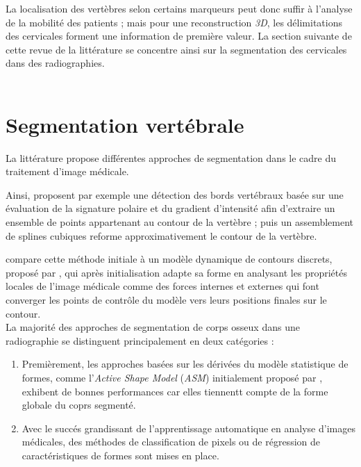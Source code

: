        La localisation des vertèbres selon certains marqueurs peut donc suffir à l'analyse de la mobilité des patients ; mais pour une reconstruction {\itshape 3D}, les délimitations des cervicales forment une information de première valeur. La section suivante de cette revue de la littérature se concentre ainsi sur la segmentation des cervicales dans des radiographies.
        \\\\


\section{Segmentation vertébrale}

    La littérature propose différentes approches de segmentation dans le cadre du traitement d'image médicale.

    Ainsi, \cite{Benjelloun2006b, Benjelloun2007} proposent par exemple une détection des bords vertébraux basée sur une évaluation de la signature polaire et du gradient d'intensité afin d'extraire un ensemble de points appartenant au contour de la vertèbre ; puis un assemblement de splines cubiques reforme approximativement le contour de la vertèbre.

    \cite{Benjelloun2008} compare cette méthode initiale à un modèle dynamique de contours discrets, proposé par \cite{Lobregt1995}, qui après initialisation adapte sa forme en analysant les propriétés locales de l'image médicale comme des forces internes et externes qui font converger les points de contrôle du modèle vers leurs positions finales sur le contour.
    \\

    La majorité des approches de segmentation de corps osseux dans une radiographie se distinguent principalement en deux catégories :

    \begin{enumerate}
        \item Premièrement, les approches basées sur les dérivées du modèle statistique de formes, comme l'{\itshape Active Shape Model} ({\itshape ASM}) initialement proposé par \cite{Cootes1995}, exhibent de bonnes performances car elles tiennentt compte de la forme globale du coprs segmenté.
        \item Avec le succés grandissant de l'apprentissage automatique en analyse d'images médicales, des méthodes de classification de pixels ou de régression de caractéristiques de formes sont mises en place.
        \\
    \end{enumerate}

